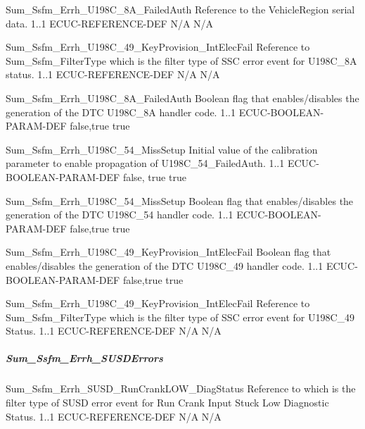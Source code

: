 {} 

{Sum_Ssfm_Errh_U198C_8A_FailedAuth}
{Reference to the VehicleRegion serial data.}
{1..1}
{ECUC-REFERENCE-DEF}
{N/A}
{N/A}

{} 


{Sum_Ssfm_Errh_U198C_49_KeyProvision_IntElecFail}
{Reference to Sum_Ssfm_FilterType which is the filter type of SSC error event for U198C_8A status.}
{1..1}
{ECUC-REFERENCE-DEF}
{N/A}
{N/A}

{Sum_Ssfm_Errh_U198C_8A_FailedAuth}
{Boolean flag that enables/disables the generation of the DTC U198C_8A handler code.}
{1..1}
{ECUC-BOOLEAN-PARAM-DEF}
{false,true}
{true}

{Sum_Ssfm_Errh_U198C_54_MissSetup}
{Initial value of the calibration parameter to enable propagation of U198C_54_FailedAuth.}
{1..1}
{ECUC-BOOLEAN-PARAM-DEF}
{false, true}
{true}

{} 

{Sum_Ssfm_Errh_U198C_54_MissSetup}
{Boolean flag that enables/disables the generation of the DTC U198C_54 handler code.}
{1..1}
{ECUC-BOOLEAN-PARAM-DEF}
{false,true}
{true}

{Sum_Ssfm_Errh_U198C_49_KeyProvision_IntElecFail}
{Boolean flag that enables/disables the generation of the DTC U198C_49 handler code.}
{1..1}
{ECUC-BOOLEAN-PARAM-DEF}
{false,true}
{true}

{Sum_Ssfm_Errh_U198C_49_KeyProvision_IntElecFail}
{Reference to Sum_Ssfm_FilterType which is the filter type of SSC error event for U198C_49 Status.}
{1..1}
{ECUC-REFERENCE-DEF}
{N/A}
{N/A}

\subparagraph{Sum_Ssfm_Errh_SUSDErrors}


{Sum_Ssfm_Errh_SUSD_RunCrankLOW_DiagStatus}
{Reference to  which is the filter type of SUSD error event for Run Crank Input Stuck Low Diagnostic Status.}
{1..1}
{ECUC-REFERENCE-DEF}
{N/A}
{N/A}

